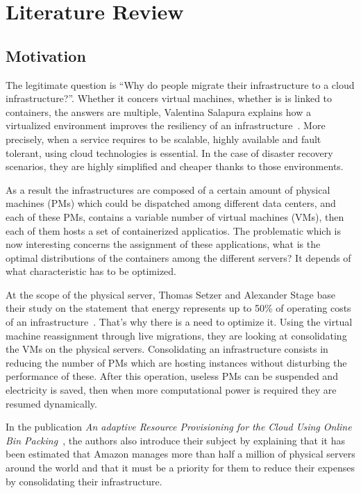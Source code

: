 \chapter{Literature Review}
\label{litreview}

\section{Motivation}

The legitimate question is “Why do people migrate their infrastructure to a
cloud infrastructure?”. Whether it concers virtual machines, whether is is linked
to containers, the answers are multiple, Valentina Salapura explains
how a virtualized environment improves the resiliency of an
infrastructure~\citep*{virtresiliency}. More precisely, when a service requires
to be scalable, highly available and fault tolerant, using cloud technologies
is essential. In the case of disaster recovery scenarios, they are highly
simplified and cheaper thanks to those environments.

As a result the infrastructures are composed of a certain amount of physical
machines (PMs) which could be dispatched among different data centers, and each
of these PMs, contains a variable number of virtual machines (VMs), then each
of them hosts a set of containerized applicatios. The problematic which is now
interesting concerns the assignment of these applications, what is the optimal
distributions of the containers among the different servers? It depends of what
characteristic has to be optimized.

At the scope of the physical server, Thomas Setzer and Alexander Stage base
their study on the statement that energy represents up to 50\% of operating
costs of an infrastructure~\citep*{reassignmentElectricitysaving}. That's why
there is a need to optimize it. Using the virtual machine reassignment through
live migrations, they are looking at consolidating the VMs on the physical
servers.  Consolidating an infrastructure consists in reducing the number of
PMs which are hosting instances without disturbing the performance of these.
After this operation, useless PMs can be suspended and electricity is saved,
then when more computational power is required they are resumed dynamically.

In the publication \textit{An adaptive Resource Provisioning for the Cloud
Using Online Bin Packing}~\citep*{reassignmentBinpacking1}, the authors also
introduce their subject by explaining that it has been estimated that Amazon
manages more than half a million of physical servers around the world and that
it must be a priority for them to reduce their expenses by consolidating
their infrastructure.

